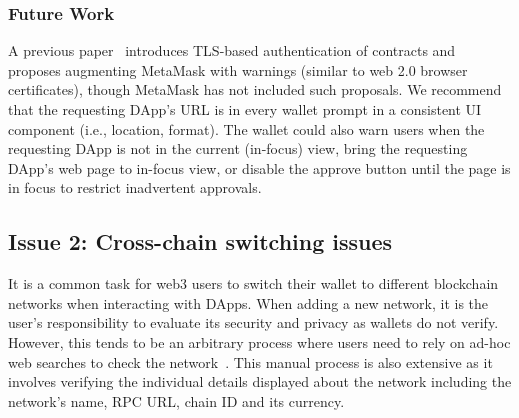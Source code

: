 \documentclass[conference]{IEEEtran}
\begin{document}
\subsubsection*{\textbf{Future Work}}
A previous paper~\cite{gallersdorfer2021augmenting} introduces TLS-based authentication of contracts and proposes augmenting MetaMask with warnings (similar to web 2.0 browser certificates), though MetaMask has not included such proposals.
We recommend that the requesting DApp's URL is in every wallet prompt in a consistent UI component (i.e., location, format).
The wallet could also warn users when the requesting DApp is not in the current (in-focus) view, bring the requesting DApp's web page to in-focus view, or disable the approve button until the page is in focus to restrict inadvertent approvals.


\subsection{Issue 2: Cross-chain switching issues}
It is a common task for web3 users to switch their wallet to different blockchain networks when interacting with DApps.
When adding a new network, it is the user's responsibility to evaluate its security and privacy as wallets do not verify. %
However, this tends to be an arbitrary process where users need to rely on ad-hoc web searches to check the network~\cite{metamaskVerifyNetwork, coinbaseCustomNetwork}.
This manual process is also extensive as it involves verifying the individual details displayed about the network including the network's name, \ac*{RPC} URL, chain ID and its currency.
\end{document}
